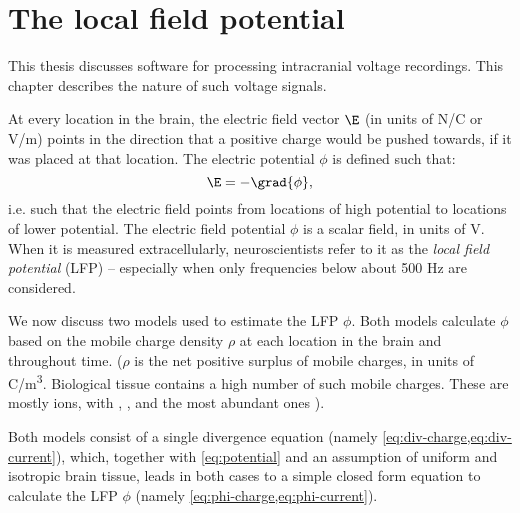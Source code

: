 \chapter{The local field potential}
\label{ch:LFP}

This thesis discusses software for processing intracranial voltage recordings. This chapter describes the nature of such voltage signals.

At every location in the brain, the electric field vector $\E$ (in units of N/C or V/m) points in the direction that a positive charge would be pushed towards, if it was placed at that location. The electric potential $\phi$ is defined\footnotemark{} such that:
%
\begin{equation}
\label{eq:potential}
\E = -\grad{\phi},
\end{equation}
%
i.e. such that the electric field points from locations of high potential to locations of lower potential. The electric field potential $\phi$ is a scalar field, in units of V. When it is measured extracellularly, neuroscientists refer to it as the \emph{local field potential} (LFP) -- especially when only frequencies below about 500 Hz are considered.


We now discuss two models used to estimate the LFP $\phi$. Both models calculate $\phi$ based on the mobile charge density $\rho$ at each location in the brain and throughout time. ($\rho$ is the net positive surplus of mobile charges, in units of C/\si{\metre^3}. Biological tissue contains a high number of such mobile charges. These are mostly ions, with , , and  the most abundant ones \cite{Martinsen2015a}).

Both models consist of a single divergence equation (namely \cref{eq:div-charge,eq:div-current}), which, together with \cref{eq:potential} and an assumption of uniform and isotropic brain tissue, leads in both cases to a simple closed form equation to calculate the LFP $\phi$ (namely \cref{eq:phi-charge,eq:phi-current}).



